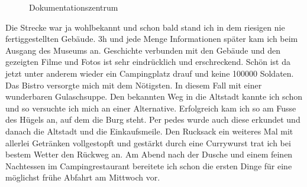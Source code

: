 \begin{figure}[H]
   \centering
   \quad
   \quad
   \caption[Dokumentationszentrum]{Dokumentationszentrum}
\end{figure}

Die Strecke war ja wohlbekannt und schon bald stand ich in dem riesigen nie fertiggestellten Gebäude.
3h und jede Menge Informationen später kam ich beim Ausgang des Museums an.
Geschichte verbunden mit den Gebäude und den gezeigten Filme und Fotos ist sehr eindrücklich und erschreckend.
Schön ist da jetzt unter anderem wieder ein Campingplatz drauf und keine 100000 Soldaten.
Das Bistro versorgte mich mit dem Nötigsten.
In diesem Fall mit einer wunderbaren Gulaschsuppe.
Den bekannten Weg in die Altstadt kannte ich schon und so versuchte ich mich an einer Alternative.
Erfolgreich kam ich so am Fusse des Hügels an, auf dem die Burg steht.
Per pedes wurde auch diese erkundet und danach die Altstadt und die Einkaufsmeile.
Den Rucksack ein weiteres Mal mit allerlei Getränken vollgestopft und gestärkt durch eine Currywurst trat ich bei bestem Wetter den Rückweg an.
Am Abend nach der Dusche und einem feinen Nachtessen im Campingrestaurant bereitete ich schon die ersten Dinge für eine möglichst frühe Abfahrt am Mittwoch vor.

